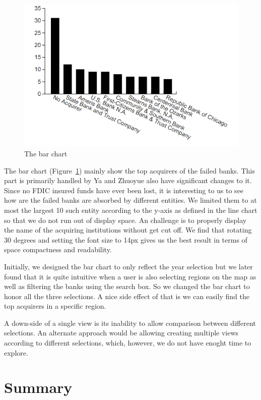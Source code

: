 \begin{figure}[!h]
    \centering
    \includegraphics{fig/barchart}
    \caption{The bar chart}
    \label{fig:barchart}
\end{figure}

The bar chart (Figure~\ref{fig:barchart}) mainly show the top acquirers of the
failed banks. This part is primarily handled by Ya and Zhuoyue also have
significant changes to it. Since no FDIC insured funds have ever
been lost, it is interesting to us to see how are the failed banks are
absorbed by different entities. We limited them to at most the largest 10 such
entity according to the y-axis as defined in the line chart so that we do not
run out of display space. An challenge is to properly display the name of the
acquiring institutions without get cut off. We find that rotating 30 degrees
and setting the font size to 14px gives us the best result in terms of space
compactness and readability.

Initially, we designed the bar chart to only reflect the year selection but we
later found that it is quite intuitive when a user is also selecting regions
on the map as well as filtering the banks using the search box. So we changed
the bar chart to honor all the three selections. A nice side effect of that is
we can easily find the top acquirers in a specific region.

A down-side of a single view is its inability to allow comparison between
different selections. An alternate approach would be allowing creating
multiple views according to different selections, which, however, we do not
have enoght time to explore.


\newpage
\section{Summary}

